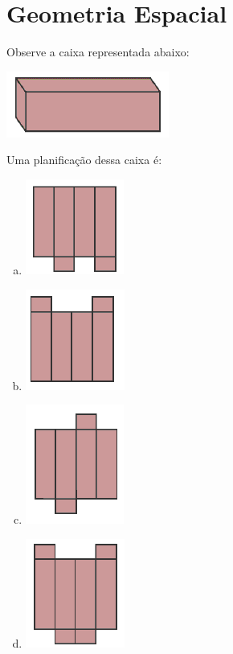 \section{Geometria Espacial}


\item  Observe a caixa representada abaixo:
\begin{center}
\includegraphics[scale=1]{figuras/fig80.png}
\end{center}
Uma planificação dessa caixa é:
\begin{multicols}{4}
\begin{enumerate}[a)]
	\item \includegraphics[scale=0.7]{figuras/fig80_a.png}
	\item \includegraphics[scale=0.7]{figuras/fig80_b.png}
	\item \includegraphics[scale=0.7]{figuras/fig80_c.png}
	\item \includegraphics[scale=0.7]{figuras/fig80_d.png} 
\end{enumerate}
\end{multicols}


